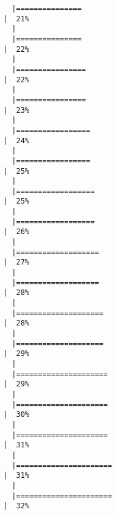 \documentclass[
  letterpaper,
]{book}
\begin{document}
\begin{verbatim}
  |===============                                                       |  21%
  |                                                                            
  |===============                                                       |  22%
  |                                                                            
  |================                                                      |  22%
  |                                                                            
  |================                                                      |  23%
  |                                                                            
  |=================                                                     |  24%
  |                                                                            
  |=================                                                     |  25%
  |                                                                            
  |==================                                                    |  25%
  |                                                                            
  |==================                                                    |  26%
  |                                                                            
  |===================                                                   |  27%
  |                                                                            
  |===================                                                   |  28%
  |                                                                            
  |====================                                                  |  28%
  |                                                                            
  |====================                                                  |  29%
  |                                                                            
  |=====================                                                 |  29%
  |                                                                            
  |=====================                                                 |  30%
  |                                                                            
  |=====================                                                 |  31%
  |                                                                            
  |======================                                                |  31%
  |                                                                            
  |======================                                                |  32%

\end{verbatim}
\end{document}
